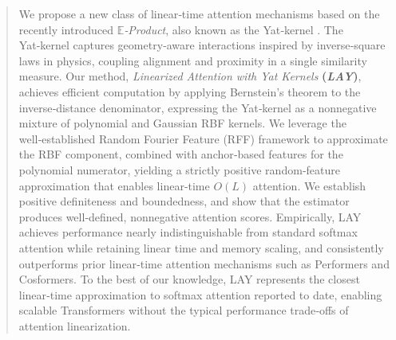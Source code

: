 \documentclass{article}
\begin{document}

\printAffiliationsAndNotice{}

\begin{abstract}
We propose a new class of linear‑time attention mechanisms based on the recently introduced \emph{$\mathbb{E}$‑Product}, also known as the Yat‑kernel \citep{Author2026Concurrent}. The Yat‑kernel captures geometry‑aware interactions inspired by inverse‑square laws in physics, coupling alignment and proximity in a single similarity measure.
Our method, \emph{Linearized Attention with Yat Kernels} \textbf{(\emph{LAY})}, achieves efficient computation by applying Bernstein's theorem to the inverse‑distance denominator, expressing the Yat‑kernel as a nonnegative mixture of polynomial and Gaussian RBF kernels. We leverage the well‑established Random Fourier Feature (RFF) framework \citep{rahimi2007random} to approximate the RBF component, combined with anchor‑based features for the polynomial numerator, yielding a strictly positive random‑feature approximation that enables linear‑time $O(L)$ attention. We establish positive definiteness and boundedness, and show that the estimator produces well‑defined, nonnegative attention scores.
Empirically, LAY achieves performance nearly indistinguishable from standard softmax attention while retaining linear time and memory scaling, and consistently outperforms prior linear‑time attention mechanisms such as Performers and Cosformers. To the best of our knowledge, LAY represents the closest linear‑time approximation to softmax attention reported to date, enabling scalable Transformers without the typical performance trade‑offs of attention linearization.
\end{abstract}
\end{document}

